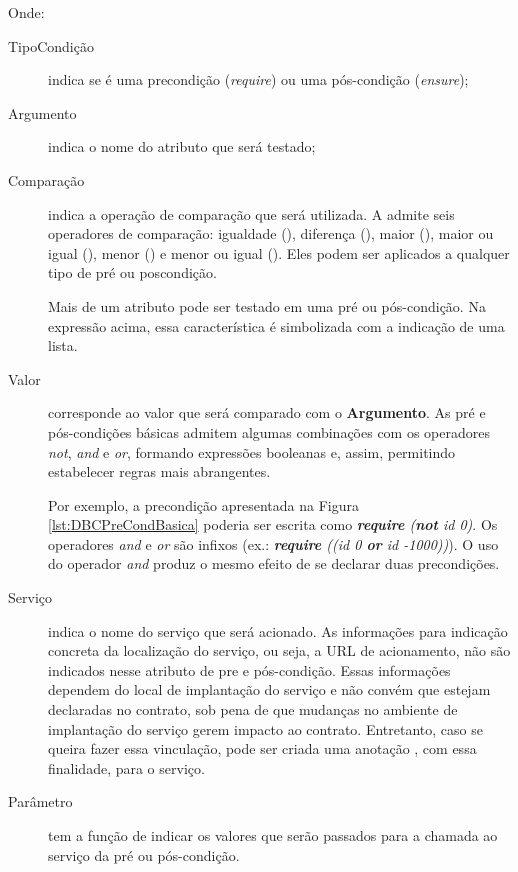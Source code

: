 Onde:
\vspace{-6mm}
\begin{description}
\item [TipoCondição] indica se é uma precondição (\emph{require}) ou uma
pós-condição (\emph{ensure});

\item [Argumento] indica o nome do atributo que será testado;

\item [Comparação] indica a operação de comparação que será utilizada. A
\neoidl{}  admite seis operadores de comparação: igualdade (\literal{==}), 
diferença (\literal{<>}), maior (\literal{>}), maior ou igual (\literal{>=}), 
menor (\literal{<}) e menor ou igual (\literal{<=}). Eles podem ser aplicados  a
qualquer tipo de pré ou poscondição.

Mais de um atributo pode ser testado em uma pré ou pós-condição. Na expressão
acima, essa característica é simbolizada com a indicação de uma lista.

\item [Valor] corresponde ao valor que será comparado com o \textbf{Argumento}.
As pré e pós-condições básicas admitem algumas combinações com os operadores
\emph{not}, \emph{and} e \emph{or}, formando expressões booleanas e,
assim, permitindo estabelecer regras mais abrangentes.

Por exemplo, a precondição apresentada na Figura \ref{lst:DBCPreCondBasica} poderia
ser escrita como \emph{\textbf{require} (\textbf{not} id \literal{<=} 0)}. Os
operadores \emph{and} e \emph{or} são infixos (ex.: \emph{\textbf{require}
((id \literal{>} 0 \textbf{or} id \literal{<=} -1000))}). O uso do operador
\emph{and} produz o mesmo efeito de se declarar duas precondições.

\item [Serviço] indica o nome do serviço que será acionado. As informações para
indicação concreta da localização do serviço, ou seja, a URL de acionamento, não
são indicados nesse atributo de pre e pós-condição. Essas informações dependem
do local de implantação do serviço e não convém que estejam declaradas no
contrato, sob pena de que mudanças no ambiente de implantação do serviço gerem
impacto ao contrato.
Entretanto, caso se queira fazer essa vinculação, pode ser criada uma anotação
\neoidl{}, com essa finalidade, para o serviço.

\item [Parâmetro] tem a função de indicar os valores que serão passados para a
chamada ao serviço da pré ou pós-condição.


\end{description}
